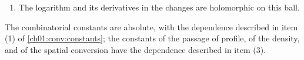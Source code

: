 \begin{lemma}
\begin{enumerate}
where $\epsilon_\partial,\epsilon_A,\epsilon_{\partial A}$ are the values of $W_{16}+D_{16}$ for $B,A,C$. A term containing the boundary change keeps a visit to $\Omega^c$, and a term containing both changes keeps an incoming factor. These bounds keep the weight of the network length. In particular, for a difference $F$ of logarithms containing the boundary change, on the working profile,
\[
 \mathcal X^\phi(F)\le C_J(\epsilon_{\partial A}+\epsilon_\partial\epsilon_A)
\]
in the case of two changes, and $\mathcal X^\phi(F)\le C_J\epsilon_\partial$ in the case of one change.
\item The logarithm and its derivatives in the changes are holomorphic on this ball.
\end{enumerate}
The combinatorial constants are absolute, with the dependence described in item (1) of \cref{ch01:conv:constants}; the constants of the passage of profile, of the density, and of the spatial conversion have the dependence described in item (3).
\end{lemma}


